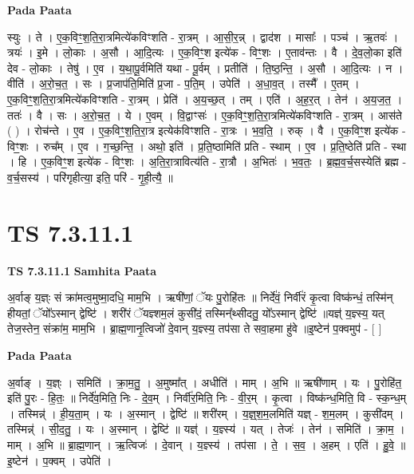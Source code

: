 \documentclass[17pt]{extarticle}
\begin{document}
\textbf{Pada Paata} \newline

स्युः । ते । ए॒क॒विꣳ॒॒श॒ति॒रा॒त्रमित्ये॑कविꣳशति - रा॒त्रम् । आ॒सी॒र॒न्न् । द्वाद॑श । मासाः᳚ । पञ्च॑ । ऋ॒तवः॑ । त्रयः॑ । इ॒मे । लो॒काः । अ॒सौ । आ॒दि॒त्यः । ए॒क॒विꣳ॒॒श इत्ये॑क - विꣳ॒॒शः । ए॒ताव॑न्तः । वै । दे॒व॒लो॒का इति॑ देव - लो॒काः । तेषु॑ । ए॒व । य॒था॒पू॒र्वमिति॑ यथा - पू॒र्वम् । प्रतीति॑ । ति॒ष्ठ॒न्ति॒ । अ॒सौ । आ॒दि॒त्यः । न । वीति॑ । अ॒रो॒च॒त॒ । सः । प्र॒जाप॑ति॒मिति॑ प्र॒जा - प॒ति॒म् । उपेति॑ । अ॒धा॒व॒त् । तस्मै᳚ । ए॒तम् । ए॒क॒विꣳ॒॒श॒ति॒रा॒त्रमित्ये॑कविꣳशति - रा॒त्रम् । प्रेति॑ । अ॒य॒च्छ॒त् । तम् । एति॑ । अ॒ह॒र॒त् । तेन॑ । अ॒य॒ज॒त॒ । ततः॑ । वै । सः । अ॒रो॒च॒त॒ । ये । ए॒वम् । वि॒द्वाꣳसः॑ । ए॒क॒विꣳ॒॒श॒ति॒रा॒त्रमित्ये॑कविꣳशति - रा॒त्रम् । आस॑ते ( ) । रोच॑न्ते । ए॒व । ए॒क॒विꣳ॒॒श॒ति॒रा॒त्र इत्येक॑विꣳशति - रा॒त्रः । भ॒व॒ति॒ । रुक् । वै । ए॒क॒विꣳ॒॒श इत्ये॑क - विꣳ॒॒शः । रुच᳚म् । ए॒व । ग॒च्छ॒न्ति॒ । अथो॒ इति॑ । प्र॒ति॒ष्ठामिति॑ प्रति - स्थाम् । ए॒व । प्र॒ति॒ष्ठेति॑ प्रति - स्था । हि । ए॒क॒विꣳ॒॒श इत्ये॑क - विꣳ॒॒शः । अ॒ति॒रा॒त्रावित्य॑ति - रा॒त्रौ । अ॒भितः॑ । भ॒व॒तः॒ । ब्र॒ह्म॒व॒र्च॒सस्येति॑ ब्रह्म - व॒र्च॒सस्य॑ । परि॑गृहीत्या॒ इति॒ परि॑ - गृ॒ही॒त्यै॒ ॥  \newline




\section*{ TS 7.3.11.1 }

\textbf{TS 7.3.11.1 } \newline
\textbf{Samhita Paata} \newline

अ॒र्वाङ् य॒ज्ञ्ः सं क्रा॑मत्व॒मुष्मा॒दधि॒ माम॒भि । ऋषी॑णां॒ ॅयः पु॒रोहि॑तः ॥ निर्दे॑वं॒ निर्वी॑रं कृ॒त्वा विष्क॑न्धं॒ तस्मि॑न् हीयतां॒ ॅयो᳚ऽस्मान् द्वेष्टि॑ । शरी॑रं ॅयज्ञ्शम॒लं कुसी॑दं॒ तस्मिन्᳚थ्सीदतु॒ यो᳚ऽस्मान् द्वेष्टि॑ ॥यज्ञ्॑ य॒ज्ञ्स्य॒ यत् तेज॒स्तेन॒ संक्रा॑म॒ माम॒भि । ब्रा॒ह्म॒णानृ॒त्विजो॑ दे॒वान् य॒ज्ञ्स्य॒ तप॑सा ते सवा॒हमा हु॑वे ॥इ॒ष्टेन॑ प॒क्वमुप॑ - [  ] \newline

\textbf{Pada Paata} \newline

अ॒र्वाङ् । य॒ज्ञ्ः । समिति॑ । क्रा॒म॒तु॒ । अ॒मुष्मा᳚त् । अधीति॑ । माम् । अ॒भि ॥ ऋषी॑णाम् । यः । पु॒रोहि॑त॒ इति॑ पु॒रः - हि॒तः॒ ॥ निर्दे॑व॒मिति॒ निः - दे॒व॒म् । निर्वी॑र॒मिति॒ निः - वी॒र॒म् । कृ॒त्वा । विष्क॑न्ध॒मिति॒ वि - स्क॒न्ध॒म् । तस्मिन्न्॑ । ही॒य॒ता॒म् । यः । अ॒स्मान् । द्वेष्टि॑ ॥ शरी॑रम् । य॒ज्ञ्॒श॒म॒लमिति॑ यज्ञ् - श॒म॒लम् । कुसी॑दम् । तस्मिन्न्॑ । सी॒द॒तु॒ । यः । अ॒स्मान् । द्वेष्टि॑ ॥ यज्ञ्॑ । य॒ज्ञ्स्य॑ । यत् । तेजः॑ । तेन॑ । समिति॑ । क्रा॒म॒ । माम् । अ॒भि ॥ ब्रा॒ह्म॒णान् । ऋ॒त्विजः॑ । दे॒वान् । य॒ज्ञ्स्य॑ । तप॑सा । ते॒ । स॒व॒ । अ॒हम् । एति॑ । हु॒वे॒ ॥ इ॒ष्टेन॑ । प॒क्वम् । उपेति॑ ।  \newline
\end{document}
